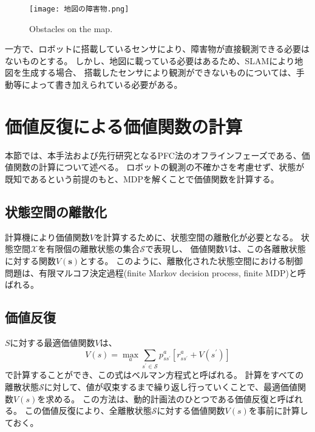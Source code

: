 \begin{figure}[h]
  \begin{center}
    \texttt{[image: 地図の障害物.png]}
    \caption{Obstacles on the map.}
    \label{fig:地図の障害物}
  \end{center}
\end{figure}

一方で、ロボットに搭載しているセンサにより、障害物が直接観測できる必要はないものとする。
しかし、地図に載っている必要はあるため、SLAMにより地図を生成する場合、
搭載したセンサにより観測ができないものについては、手動等によって書き加えられている必要がある。


\section{価値反復による価値関数の計算} \label{section:価値関数}
本節では、本手法および先行研究となるPFC法のオフラインフェーズである、価値関数の計算について述べる。
ロボットの観測の不確かさを考慮せず、状態が既知であるという前提のもと、MDPを解くことで価値関数を計算する。

\subsection{状態空間の離散化}
計算機により価値関数$V$を計算するために、状態空間の離散化が必要となる。
状態空間$\mathcal{X}$を有限個の離散状態の集合$\mathcal{S}$で表現し、
価値関数$V$は、この各離散状態に対する関数$V(\bm{s})$とする。
このように、離散化された状態空間における制御問題は、有限マルコフ決定過程(finite Markov decision process, finite MDP)と呼ばれる。



\subsection{価値反復}
$S$に対する最適価値関数$V$は、
\begin{equation}
\label{bellman equation}
  V(s) = \max_{a} \sum_{s^{\prime} \in \mathcal{S}}
         p^{a}_{ss^{\prime}} \left[ r^{a}_{ss^{\prime}} + V(s^{\prime}) \right]
\end{equation}
で計算することができ、この式はベルマン方程式と呼ばれる。
計算をすべての離散状態$\mathcal{S}$に対して、値が収束するまで繰り返し行っていくことで、最適価値関数$V(s)$を求める。
この方法は、動的計画法のひとつである価値反復と呼ばれる。
この価値反復により、全離散状態$\mathcal{S}$に対する価値関数$V(s)$を事前に計算しておく。



